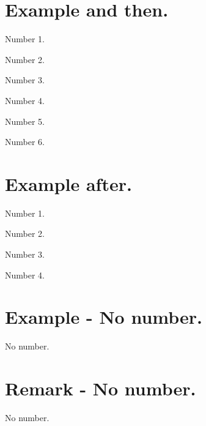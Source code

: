 \documentclass[10pt, a4paper]{article}
\begin{document}
\section{Example and then.}

\begin{tdocexa}
    Number 1.
\end{tdocexa}

\begin{tdocexa}
    Number 2.
\end{tdocexa}

\begin{tdocrem}
    Number 3.
\end{tdocrem}

\begin{tdocexa}
    Number 4.
\end{tdocexa}

\begin{tdocrem}
    Number 5.
\end{tdocrem}

\begin{tdocrem}
    Number 6.
\end{tdocrem}


\section{Example after.}

\begin{tdocrem}
    Number 1.
\end{tdocrem}

\begin{tdocrem}
    Number 2.
\end{tdocrem}

\begin{tdocrem}
    Number 3.
\end{tdocrem}

\begin{tdocexa}
    Number 4.
\end{tdocexa}


\section{Example - No number.}

\begin{tdocexa}
    No number.
\end{tdocexa}


\section{Remark - No number.}

\begin{tdocrem}
    No number.
\end{tdocrem}
\end{document}
